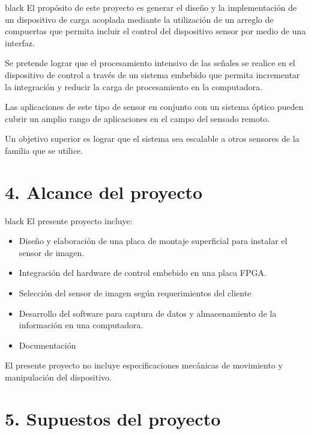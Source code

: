 \documentclass[
11pt, %
codirector, %
]{charter}
\begin{document}
\begin{consigna}{black}
El propósito de este proyecto es generar el diseño y la implementación de un dispositivo de carga acoplada mediante la utilización de un arreglo de compuertas que permita incluir el control del dispositivo sensor por medio de una interfaz. 

Se pretende lograr que el procesamiento intensivo de las señales se realice en el dispositivo de control a través de un sistema embebido que permita incrementar la integración y reducir la carga de procesamiento en la computadora. 

Las aplicaciones de este tipo de sensor en conjunto con un sistema óptico pueden cubrir un amplio rango de aplicaciones en el campo del sensado remoto.

Un objetivo superior es lograr que el sistema sea escalable a otros sensores de la familia que se utilice.

\end{consigna}

\section{4. Alcance del proyecto}
\label{sec:alcance}

\begin{consigna}{black}
El presente proyecto incluye:

\begin{itemize}
	\item Diseño y elaboración de una placa de montaje superficial para instalar el sensor de imagen.
	\item Integración del hardware de control embebido en una placa FPGA.
	\item Selección del sensor de imagen según requerimientos del cliente
	\item Desarrollo del software para captura de datos y almacenamiento de la información en una computadora.
	\item Documentación

\end{itemize}

El presente proyecto no incluye especificaciones mecánicas de movimiento y manipulación del dispositivo.

\end{consigna}


\section{5. Supuestos del proyecto}
\label{sec:supuestos}
\end{document}
